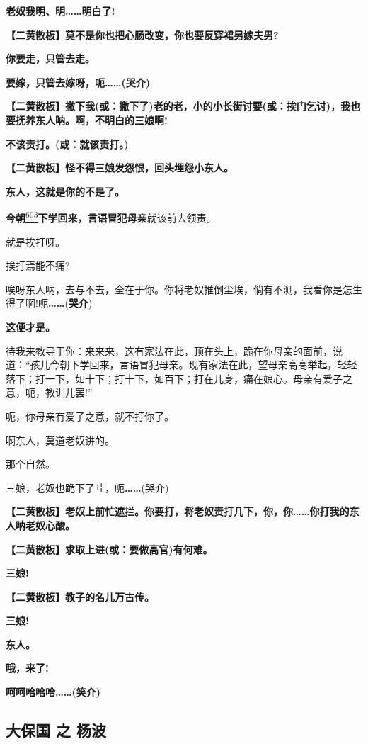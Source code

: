 \textbf{老奴我明、明\ldots{}\ldots{}明白了!}

\textbf{【二黄散板】莫不是你也把心肠改变，你也要反穿裙另嫁夫男?}

\textbf{你要走，只管去走。}

\textbf{要嫁，只管去嫁呀，呃\ldots{}\ldots{}(哭介)}

\textbf{【二黄散板】撇下我(或：撇下了)老的老，小的小长街讨要(或：挨门乞讨)，我也要抚养东人呐。啊，不明白的三娘啊!}

\textbf{不该责打。(或：就该责打。)}

\textbf{【二黄散板】怪不得三娘发怨恨，回头埋怨小东人。}

\textbf{东人，这就是你的不是了。}

\textbf{今朝}\protect\hyperlink{fn603}{\textsuperscript{603}}\textbf{下学回来，言语冒犯母亲}就该前去领责。

就是挨打呀。

挨打焉能不痛?

唉呀东人呐，去与不去，全在于你。你将老奴推倒尘埃，倘有不测，我看你是怎生得了啊!呃\textbf{\ldots{}\ldots{}}(\textbf{哭介})

\textbf{这便才是。}

待我来教导于你：来来来，这有家法在此，顶在头上，跪在你母亲的面前，说道：``孩儿今朝下学回来，言语冒犯母亲。现有家法在此，望母亲高高举起，轻轻落下；打一下，如十下；打十下，如百下；打在儿身，痛在娘心。母亲有爱子之意，呃，教训儿罢!''

呃，你母亲有爱子之意，就不打你了。

啊东人，莫道老奴讲的。

那个自然。

三娘，老奴也跪下了哇，呃\textbf{\ldots{}\ldots{}}(哭介)

\textbf{【二黄散板】老奴上前忙遮拦。你要打，将老奴责打几下，你，你\ldots{}\ldots{}你打我的东人呐老奴心酸。}

\textbf{【二黄散板】求取上进(或：要做高官)有何难。}

\textbf{三娘!}

\textbf{【二黄散板】教子的名儿万古传。}

\textbf{三娘!}

\textbf{东人。}

\textbf{哦，来了!}

\textbf{呵呵哈哈哈\ldots{}\ldots{}(笑介)}

\hypertarget{ux5927ux4fddux56fd-ux4e4b-ux6768ux6ce2}{%
\subsection{大保国 之
杨波}\label{ux5927ux4fddux56fd-ux4e4b-ux6768ux6ce2}}

